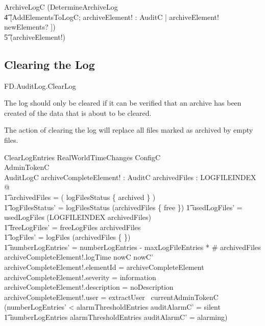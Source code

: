 \begin{zed}
        ArchiveLogC  (DetermineArchiveLog \semi 
\\ \t4  [AddElementsToLogC; archiveElement! : AuditC | archiveElement! \in
newElements? ]) 
\\ \t5        \hide (archiveElement!)
\end{zed}

\subsection{Clearing the Log}

\begin{traceunit}{FD.AuditLog.ClearLog}
\end{traceunit}

The log should only be cleared if it can be verified that an archive
has been created of the data that is about to be cleared.

The action of clearing the log will replace all files marked as
archived by empty files.

\begin{schema}{ClearLogEntries}
        RealWorldTimeChanges
\also
        ConfigC
\\      AdminTokenC
\\      \Delta AuditLogC
\also
        archiveCompleteElement! : AuditC
\where
        \exists archivedFiles : \finset LOGFILEINDEX @
\\ \t1        archivedFiles = \dom ( logFilesStatus \rres \{ archived \} )
\\ \t1       \land logFilesStatus' = logFilesStatus \oplus (archivedFiles
\cross \{ free \})
\also
    \t1     \land usedLogFiles' = usedLogFiles \filter (LOGFILEINDEX \setminus archivedFiles)
\\  \t1      \land freeLogFiles' = freeLogFiles \cup archivedFiles
\\  \t1      \land logFiles' = logFiles \oplus (archivedFiles \cross 
        \{ \emptyset \})
\\  \t1      \land numberLogEntries' = numberLogEntries - maxLogFileEntries *
\# archivedFiles
\also
        archiveCompleteElement!.logTime \in nowC \upto nowC'
\\      archiveCompleteElement!.elementId = archiveCompleteElement
\\      archiveCompleteElement!.severity = information
\\      archiveCompleteElement!.description = noDescription
\\      archiveCompleteElement!.user = extractUser~ currentAdminTokenC 
\also
        (numberLogEntries' < alarmThresholdEntries \land
        auditAlarmC' = silent
\\ \t1  \lor numberLogEntries \geq alarmThresholdEntries \land
        auditAlarmC' = alarming)
\end{schema}

